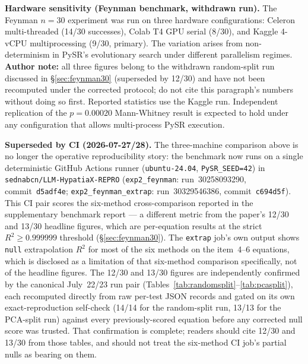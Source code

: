 \documentclass[twoside,11pt]{article}
\newcommand{\Rsq}{R^{2}}
\begin{document}
\textbf{Hardware sensitivity (Feynman benchmark, withdrawn run).}  The Feynman $n=30$ experiment was
run on three hardware configurations: Celeron multi-threaded (14/30 successes),
Colab T4 GPU serial (8/30), and Kaggle 4-vCPU multiprocessing (9/30, primary).
The variation arises from non-determinism in PySR's evolutionary search under
different parallelism regimes. \textbf{Author note:} all three figures belong
to the withdrawn random-split run discussed in \S\ref{sec:feynman30}
(superseded by 12/30) and have not been recomputed under the corrected
protocol; do not cite this paragraph's numbers without doing so first.
Reported statistics use the Kaggle run.
Independent replication of the $p=0.00020$ Mann-Whitney result is expected to hold
under any configuration that allows multi-process PySR execution.

\textbf{Superseded by CI (2026-07-27/28).} The three-machine comparison above
is no longer the operative reproducibility story: the benchmark now runs on a
single deterministic GitHub Actions runner (\texttt{ubuntu-24.04},
\texttt{PySR\_SEED=42}) in \texttt{sednabcn/LLM-HypatiaX-REPRO}
(\texttt{exp2\_feynman}: run~30258093290, commit~\texttt{d5adf4e};
\texttt{exp2\_feynman\_extrap}: run~30329546386, commit~\texttt{c694d5f}).
This CI pair scores the six-method cross-comparison reported in the
supplementary benchmark report --- a different metric from the paper's
12/30 and 13/30 headline figures, which are per-equation results at the
strict $\Rsq \geq 0.999999$ threshold (\S\ref{sec:feynman30}). The
\texttt{extrap} job's own output shows \texttt{null} extrapolation $\Rsq$
for most of the six methods on the item~4--6 equations, which is disclosed
as a limitation of that six-method comparison specifically, not of the
headline figures. The 12/30 and 13/30 figures are independently confirmed
by the canonical July~22/23 run pair (Tables~\ref{tab:randomsplit}--\ref{tab:pcasplit}),
each recomputed directly from raw per-test JSON records and gated on its
own exact-reproduction self-check (14/14 for the random-split run, 13/13
for the PCA-split run) against every previously-scored equation before any
corrected null score was trusted. That confirmation is complete; readers
should cite 12/30 and 13/30 from those tables, and should not treat the
six-method CI job's partial nulls as bearing on them.

\end{document}
